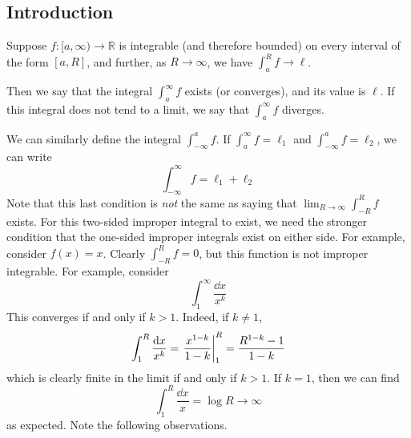 \subsection{Introduction}
\begin{definition}
	Suppose \(f \colon [a, \infty) \to \mathbb R\) is integrable (and therefore bounded) on every interval of the form \([a, R]\), and further, as \(R \to \infty\), we have \(\int_a^R f \to \ell\).

	Then we say that the integral \(\int_a^\infty f\) exists (or converges), and its value is \(\ell\).
	If this integral does not tend to a limit, we say that \(\int_a^\infty f\) diverges.
\end{definition}
\noindent We can similarly define the integral \(\int_{-\infty}^a f\).
If \(\int_a^\infty f = \ell_1\) and \(\int_{-\infty}^a f = \ell_2\), we can write
\[
	\int_{-\infty}^\infty f = \ell_1 + \ell_2
\]
Note that this last condition is \textit{not} the same as saying that \(\lim_{R \to \infty}\int_{-R}^R f\) exists.
For this two-sided improper integral to exist, we need the stronger condition that the one-sided improper integrals exist on either side.
For example, consider \(f(x) = x\).
Clearly \(\int_{-R}^R f = 0\), but this function is not improper integrable.
For example, consider
\[
	\int_1^\infty \frac{\dd{x}}{x^k}
\]
This converges if and only if \(k > 1\).
Indeed, if \(k \neq 1\),
\[
	\int_1^R \frac{\dd{x}}{x^k} = \eval{\frac{x^{1-k}}{1-k}}_1^R = \frac{R^{1-k} - 1}{1-k}
\]
which is clearly finite in the limit if and only if \(k > 1\).
If \(k=1\), then we can find
\[
	\int_1^R \frac{\dd{x}}{x} = \log R \to \infty
\]
as expected.
Note the following observations.
